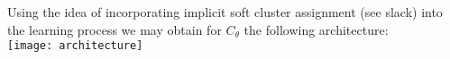 \documentclass[a4paper, 11pt]{article}
\begin{document}
	Using the idea of incorporating implicit soft cluster assignment (see slack) into the learning process we may obtain for $C_\theta$ the following architecture:\\
	
	\texttt{[image: architecture]}
	
	
	
	
	
\end{document}
